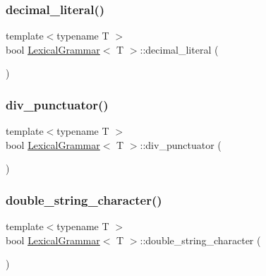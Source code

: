 \mbox{\label{class_lexical_grammar_aa4b1f1f944befbe96ee450a0399e85df}} 
\subsubsection{\texorpdfstring{decimal\+\_\+literal()}{decimal\_literal()}}
{\footnotesize\ttfamily template$<$typename T $>$ \\
bool \hyperlink{class_lexical_grammar}{Lexical\+Grammar}$<$ T $>$\+::decimal\+\_\+literal (\begin{DoxyParamCaption}{ }\end{DoxyParamCaption})\hspace{0.3cm}{\ttfamily [inline]}}

\mbox{\label{class_lexical_grammar_a37ea4db956749e0519e34ec8e304d2fb}} 
\subsubsection{\texorpdfstring{div\+\_\+punctuator()}{div\_punctuator()}}
{\footnotesize\ttfamily template$<$typename T $>$ \\
bool \hyperlink{class_lexical_grammar}{Lexical\+Grammar}$<$ T $>$\+::div\+\_\+punctuator (\begin{DoxyParamCaption}{ }\end{DoxyParamCaption})\hspace{0.3cm}{\ttfamily [inline]}}

\mbox{\label{class_lexical_grammar_a473842f8e78b003d65e4459eec57bf8d}} 
\subsubsection{\texorpdfstring{double\+\_\+string\+\_\+character()}{double\_string\_character()}}
{\footnotesize\ttfamily template$<$typename T $>$ \\
bool \hyperlink{class_lexical_grammar}{Lexical\+Grammar}$<$ T $>$\+::double\+\_\+string\+\_\+character (\begin{DoxyParamCaption}{ }\end{DoxyParamCaption})\hspace{0.3cm}{\ttfamily [inline]}}

